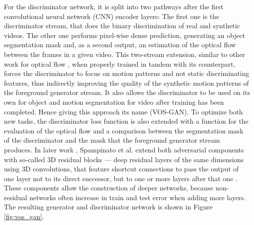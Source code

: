 For the discriminator network, it is split into two pathways after the first convolutional neural network (CNN) encoder layers: The first one is the discriminator stream, that does the binary discrimination of real and synthetic videos. The other one performs pixel-wise dense prediction, generating an object segmentation mask and, as a second output, an estimation of the optical flow between the frames in a given video. This two-stream extension, similar to other work for optical flow \cite{simonyan2014two, lai2017semi}, when properly trained in tandem with its counterpart, forces the discriminator to focus on motion patterns and not static discriminating features, thus indirectly improving the quality of the synthetic motion patterns of the foreground generator stream. It also allows the discriminator to be used on its own for object and motion segmentation for video after training has been completed. Hence giving this approach its name (VOS-GAN). To optimize both new tasks, the discriminator loss function is also extended with a function for the evaluation of the optical flow and a comparison between the segmentation mask of the discriminator and the mask that the foreground generator stream produces. In later work \cite{spampinato2019adversarial}, Spampinato et al. extend both adversarial components with so-called 3D residual blocks --- deep residual layers of the same dimensions using 3D convolutions, that feature shortcut connections to pass the output of one layer not to its direct successor, but to one or more layers after that one \cite{he2016deep}. These components allow the construction of deeper networks, because non-residual networks often increase in train and test error when adding more layers. The resulting generator and discriminator network is shown in Figure \ref{fig:vos_gan}. 

